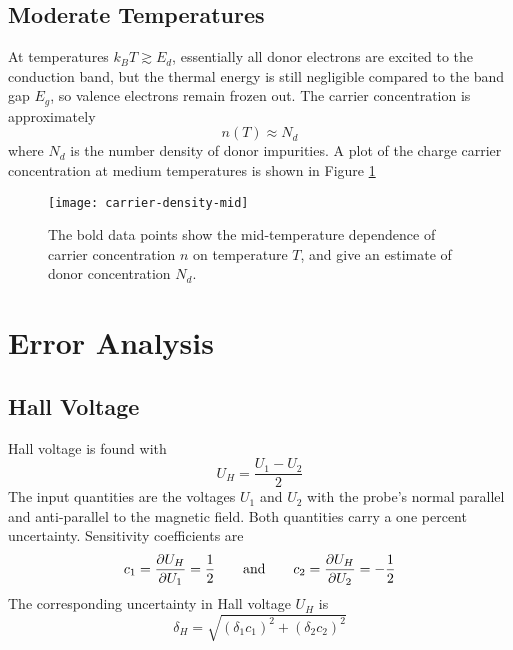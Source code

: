 \documentclass[11pt, a4paper]{article}
\newcommand{\eqtext}[1]{\qquad \text{#1} \qquad}
\begin{document}
\subsection{Moderate Temperatures}	
At temperatures $ k_{B}T \gtrsim E_{d} $, essentially all donor electrons are excited to the conduction band, but the thermal energy is still negligible compared to the band gap $ E_{g} $, so valence electrons remain frozen out. The carrier concentration is approximately
\begin{equation*}
	n(T) \approx N_{d}
\end{equation*}
where $ N_{d} $ is the number density of donor impurities. A plot of the charge carrier concentration at medium temperatures is shown in Figure \ref{hall:fig:n-midT}

\begin{figure}[htb!]
	\centering
	\texttt{[image: carrier-density-mid]}
	\caption{The bold data points show the mid-temperature dependence of carrier concentration $ n $ on temperature $ T $, and give an estimate of donor concentration $ N_{d} $.}
	\label{hall:fig:n-midT}
\end{figure}

		
\section{Error Analysis}
\subsection{Hall Voltage}
Hall voltage is found with
\begin{equation*}
	U_{H} = \frac{U_{1} - U_{2}}{2}
\end{equation*}
The input quantities are the voltages $ U_{1} $ and $ U_{2} $ with the probe's normal parallel and anti-parallel to the magnetic field. Both quantities carry a one percent uncertainty. Sensitivity coefficients are
\begin{equation*}
	c_{1} = \pdv{U_{H}}{U_{1}}  = \frac{1}{2} \eqtext{and} c_{2} = \pdv{U_{H}}{U_{2}} = -\frac{1}{2} 
\end{equation*}
The corresponding uncertainty in Hall voltage $ U_{H} $ is
\begin{equation*}
	\delta_{H} = \sqrt{(\delta_{1}c_{1})^{2} + (\delta_{2}c_{2})^{2}}
\end{equation*}
\end{document}
